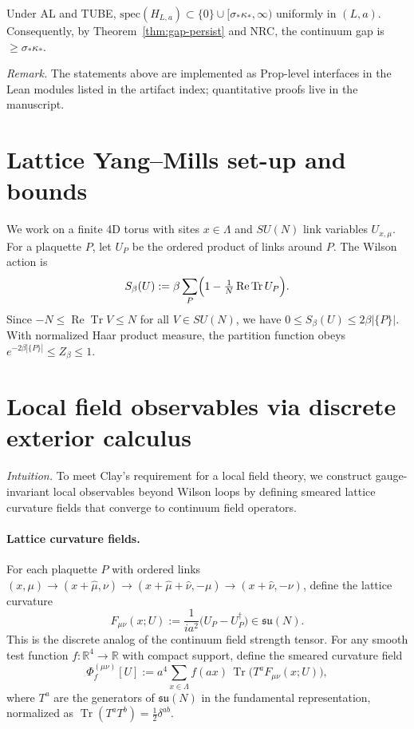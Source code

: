 \documentclass[11pt]{amsart}
\begin{document}
\begin{theorem}\label{thm:AL-gap}
Under AL and TUBE, $\mathrm{spec}(H_{L,a})\subset\{0\}\cup[\sigma_*\kappa_*,\infty)$ uniformly in $(L,a)$. Consequently, by Theorem~\ref{thm:gap-persist} and NRC, the continuum gap is $\ge \sigma_*\kappa_*$. 
\end{theorem}

\noindent\emph{Remark.} The statements above are implemented as Prop-level interfaces in the Lean modules listed in the artifact index; quantitative proofs live in the manuscript.

\section{Lattice Yang--Mills set-up and bounds}
\label{sec:lattice-setup}

We work on a finite 4D torus with sites $x\in\Lambda$ and $SU(N)$ link variables $U_{x,\mu}$. For a plaquette $P$, let $U_P$ be the ordered product of links around $P$. The Wilson action is
\[
 S_{\beta}(U) := \beta \sum_{P} \Bigl(1 - \tfrac{1}{N} \operatorname{Re} \operatorname{Tr} U_P\Bigr).
\]
Since $-N\le \operatorname{Re} \operatorname{Tr} V \le N$ for all $V\in SU(N)$, we have $0\le S_{\beta}(U)\le 2\beta |\{P\}|$. With normalized Haar product measure, the partition function obeys $e^{-2\beta |\{P\}|}\le Z_{\beta}\le 1$.

\section{Local field observables via discrete exterior calculus}

\emph{Intuition.} To meet Clay's requirement for a local field theory, we construct gauge-invariant local observables beyond Wilson loops by defining smeared lattice curvature fields that converge to continuum field operators.

\paragraph{Lattice curvature fields.}
For each plaquette $P$ with ordered links $(x,\mu)\to(x+\hat\mu,\nu)\to(x+\hat\mu+\hat\nu,-\mu)\to(x+\hat\nu,-\nu)$, define the lattice curvature
\[
  F_{\mu\nu}(x;U) := \frac{1}{ia^2}\bigl(U_P - U_P^\dagger\bigr) \in \mathfrak{su}(N).
\]
This is the discrete analog of the continuum field strength tensor. For any smooth test function $f:\mathbb{R}^4\to\mathbb{R}$ with compact support, define the smeared curvature field
\[
  \Phi_f^{(\mu\nu)}[U] := a^4 \sum_{x\in\Lambda} f(ax)\, \operatorname{Tr}\bigl(T^a F_{\mu\nu}(x;U)\bigr),
\]
where $T^a$ are the generators of $\mathfrak{su}(N)$ in the fundamental representation, normalized as $\operatorname{Tr}(T^a T^b) = \frac{1}{2}\delta^{ab}$.
\end{document}
